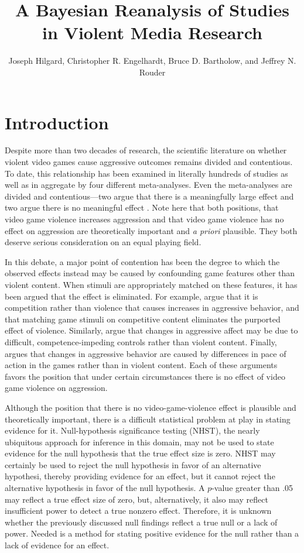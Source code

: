 \documentclass[fignum,nobf,man]{apa}
\author{Joseph Hilgard, Christopher R. Engelhardt, Bruce D. Bartholow, and Jeffrey N. Rouder}
\title{A Bayesian Reanalysis of Studies in Violent Media Research}
\affiliation{University of Missouri}
\begin{document}
\maketitle

\section*{Introduction}
Despite more than two decades of research, the scientific literature on whether violent video games cause aggressive outcomes remains divided and contentious. To date, this relationship has been examined in literally hundreds of studies as well as in aggregate by four different meta-analyses. Even the meta-analyses are divided and contentious---two argue that there is a meaningfully large effect \citep{Anderson:etal:2010,Greietemeyer:Mugge:2014} and two argue there is no meaningful effect \citep{Ferguson:YEAR NEEDED; Sherry:2001}. %
Note here that both positions, that video game violence increases aggression and that video game violence has no effect on aggression are theoretically important and {\em a priori} plausible.  They both deserve serious consideration on an equal playing field.

In this debate, a major point of contention has been the degree to which the observed effects instead may be caused by confounding game features other than violent content. When stimuli are appropriately matched on these features, it has been argued that the effect is eliminated. For example, \citet{Adachi:Willoughby:2011} argue that it is competition rather than violence that causes increases in aggressive behavior, and that matching game stimuli on competitive content eliminates the purported effect of violence. Similarly, \citet{Przybylski:etal:2014} argue that changes in aggressive affect may be due to difficult, competence-impeding controls rather than violent content. Finally,  \citet{Elson:etal:2014} argues that changes in aggressive behavior are caused by differences in pace of action in the games rather than in violent content. Each of these arguments favors the position that under certain circumstances there is no effect of video game violence on aggression.

Although the position that there is no video-game-violence effect is plausible and theoretically important, there is a difficult statistical problem at play in stating evidence for it. Null-hypothesis significance testing (NHST), the nearly ubiquitous approach for inference in this domain, may not be used to state evidence for the null hypothesis that the true effect size is zero.  NHST may certainly be used to reject the null hypothesis in favor of an alternative hypothesi, thereby providing evidence for an effect, but it cannot reject the alternative hypothesis in favor of the null hypothesis. A $p$-value greater than .05 may reflect a true effect size of zero, but, alternatively, it also may reflect insufficient power to detect a true nonzero effect. Therefore, it is unknown whether the previously discussed null findings reflect a true null or a lack of power.    Needed is a method for stating positive evidence for the null rather than a lack of evidence for an effect.
\end{document}
